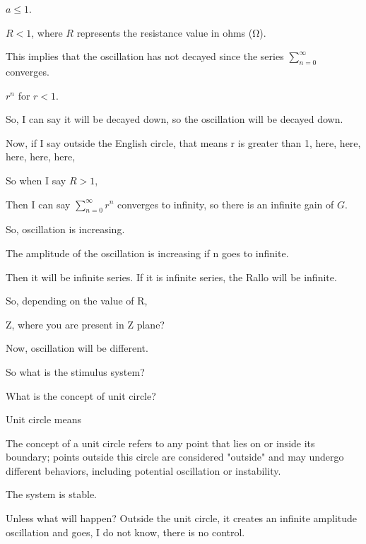 \documentclass{article}
\begin{document}
$a \leq 1$.

$R < 1$, where $R$ represents the resistance value in ohms (Ω).

This implies that the oscillation has not decayed since the series $\sum_{n=0}^{\infty}$ converges.

$r^n$ for $r < 1$.

So, I can say it will be decayed down, so the oscillation will be decayed down.



Now, if I say outside the English circle, that means r is greater than 1, here, here, here, here, here,

So when I say $R > 1$,

Then I can say $\sum_{n=0}^{\infty} r^n$ converges to infinity, so there is an infinite gain of $G$.

So, oscillation is increasing.

The amplitude of the oscillation is increasing if n goes to infinite.

Then it will be infinite series. If it is infinite series, the Rallo will be infinite.





So, depending on the value of R,

Z, where you are present in Z plane?

Now, oscillation will be different.

So what is the stimulus system?

What is the concept of unit circle?

Unit circle means

The concept of a unit circle refers to any point that lies on or inside its boundary; points outside this circle are considered "outside" and may undergo different behaviors, including potential oscillation or instability.

The system is stable.

Unless what will happen? Outside the unit circle, it creates an infinite amplitude oscillation and goes, I do not know, there is no control.
\end{document}
